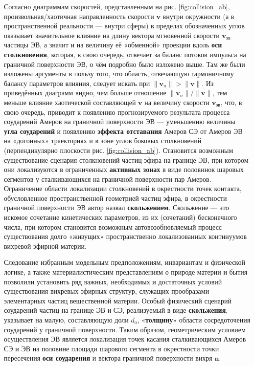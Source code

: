 Согласно диаграммам скоростей, представленным на рис. \ref{fig:collision_ab}, произвольная/хаотичная направленность скорости \(\mathbf{v}\) внутри окружности (а в пространственной реальности — внутри сферы) в пределах обозначенных углов оказывает значительное влияние на длину вектора мгновенной скорости \(\mathbf{v}_{\text{эв}}\) частицы ЭВ, а значит и на величину её «обменной» проекции вдоль \textbf{оси столкновения}, которая, в свою очередь, отвечает за баланс потоков импульса на граничной поверхности ЭВ, о чём подробно было изложено выше. Там же были изложены аргументы в пользу того, что область, отвечающую гармоничному балансу параметров влияния, следует искать при \(\|\mathbf{v}_n\| > \|\mathbf{v}\|\). Из приведённых диаграмм видно, чем больше отношение \(\|\mathbf{v}_n\| / \|\mathbf{v}\|\), тем меньше влияние хаотической составляющей \(\mathbf{v}\) на величину скорости \(\mathbf{v}_{\text{эв}}\), что, в свою очередь, приводит к появлению прогнозируемого результата процесса соударений Амеров на граничной поверхности ЭВ — уменьшению величины \textbf{угла соударений} и появлению \textbf{эффекта отставания} Амеров СЭ от Амеров ЭВ на «догонных» траекториях и в зоне углов боковых столкновений (перпендикулярно плоскости рис. \ref{fig:collision_ab}). Становится возможным существование сценария столкновений частиц эфира на границе ЭВ, при котором они локализуются в ограниченных \textbf{активных зонах} в виде половинок шаровых сегментов у сталкивающихся на граничной поверхности пар Амеров. Ограничение области локализации столкновений в окрестности точек контакта, обусловленное пространственной геометрией частиц эфира, в окрестности граничной поверхности ЭВ автор назвал \textbf{скольжением}. Скольжение — это искомое сочетание кинетических параметров, из их (сочетаний) бесконечного числа, при котором становится возможным автовозобновляемый процесс существования долго «живущих» пространственно локализованных континуумов вихревой эфирной материи.

Следование избранным модельным предположениям, инвариантам и физической логике, а также материалистическим представлениям о природе материи и бытия позволили установить ряд важных, необходимых и достаточных условий существования вихревых эфирных структур, служащих прообразами элементарных частиц вещественной материи. Особый физический сценарий соударений частиц на границе ЭВ и СЭ, реализуемый в виде \textbf{скольжения}, указывает на малую, составляющую доли \(d_a\), «\textbf{толщину}» области сосредоточения соударений у граничной поверхности. Таким образом, геометрическим условием осуществления ЭВ является локализация точек касания сталкивающихся Амеров СЭ и ЭВ на половине площади шарового сегмента в окрестности точки пересечения \textbf{оси соударения} и вектора граничной поверхности вихря \(\mathbf{n}\).

